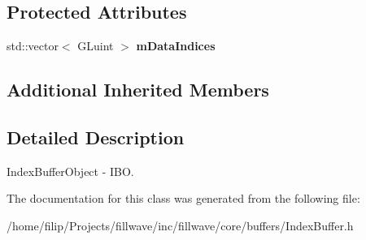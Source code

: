 \subsection*{Protected Attributes}
\begin{DoxyCompactItemize}
\item 
std\+::vector$<$ G\+Luint $>$ {\bfseries m\+Data\+Indices}\hypertarget{classflw_1_1flc_1_1IndexBuffer_a381007fe9db407c570104bdbd7f7d810}{}\label{classflw_1_1flc_1_1IndexBuffer_a381007fe9db407c570104bdbd7f7d810}

\end{DoxyCompactItemize}
\subsection*{Additional Inherited Members}


\subsection{Detailed Description}
Index\+Buffer\+Object -\/ I\+BO. 

The documentation for this class was generated from the following file\+:\begin{DoxyCompactItemize}
\item 
/home/filip/\+Projects/fillwave/inc/fillwave/core/buffers/Index\+Buffer.\+h\end{DoxyCompactItemize}

